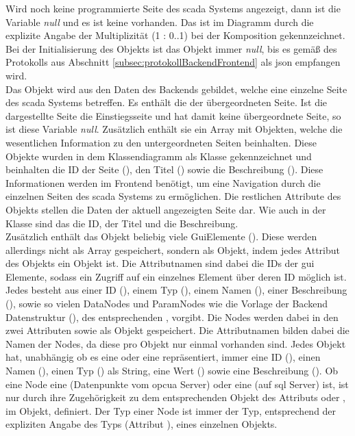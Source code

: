 Wird noch keine programmierte Seite des \ac{scada} Systems angezeigt, dann ist die Variable  \emph{null} und es ist keine  vorhanden.
Das ist im Diagramm durch die explizite Angabe der Multiplizität (1 : 0..1) bei der Komposition gekennzeichnet.
Bei der Initialisierung des  Objekts ist das  Objekt immer \emph{null}, 
bis es gemäß des Protokolls aus Abschnitt \ref{subsec:protokollBackendFrontend} als \ac{json} empfangen wird.
\\Das {} Objekt wird aus den Daten des Backends gebildet, welche eine einzelne Seite des \ac{scada} Systems betreffen.
Es enthält die  der übergeordneten Seite. 
Ist die dargestellte Seite die Einstiegsseite und hat damit keine übergeordnete Seite, so ist diese Variable \emph{null}.
Zusätzlich enthält sie ein Array mit Objekten, welche die wesentlichen Information zu den untergeordneten Seiten beinhalten.
Diese Objekte wurden in dem Klassendiagramm als  Klasse gekennzeichnet und beinhalten die ID der Seite (), 
den Titel () sowie die Beschreibung ().
Diese Informationen werden im Frontend benötigt, um eine Navigation durch die einzelnen Seiten des \ac{scada} Systems zu ermöglichen.
Die restlichen Attribute des  Objekts stellen die Daten der aktuell angezeigten Seite dar.
Wie auch in der  Klasse sind das die ID, der Titel und die Beschreibung.
\\Zusätzlich enthält das  Objekt beliebig viele GuiElemente (). 
Diese werden allerdings nicht als Array gespeichert, sondern als Objekt, indem jedes Attribut des Objekts ein  Objekt ist.
Die Attributnamen sind dabei die IDs der \ac{gui} Elemente, sodass ein Zugriff auf ein einzelnes Element über deren ID möglich ist.
Jedes  besteht aus einer ID (), einem Typ (), einem Namen (), 
einer Beschreibung (), sowie so vielen DataNodes und ParamNodes wie die Vorlage der Backend Datenstruktur (), des entsprechenden , vorgibt.
Die Nodes werden dabei in den zwei Attributen  sowie  als Objekt gespeichert. Die Attributnamen bilden dabei die Namen der Nodes, da diese pro  Objekt nur einmal vorhanden sind. 
Jedes  Objekt hat, unabhängig ob es eine  oder eine  repräsentiert, 
immer eine ID (), einen Namen (), einen Typ () als String, eine Wert () sowie eine Beschreibung ().
Ob eine Node eine  (Datenpunkte vom \ac{opcua} Server) oder eine  (auf \ac{sql} Server) ist, ist nur durch ihre Zugehörigkeit zu dem entsprechenden Objekt des Attributs  oder , im  Objekt, definiert.
Der Typ einer Node ist immer der Typ, entsprechend der expliziten Angabe des Typs (Attribut ), eines einzelnen  Objekts.